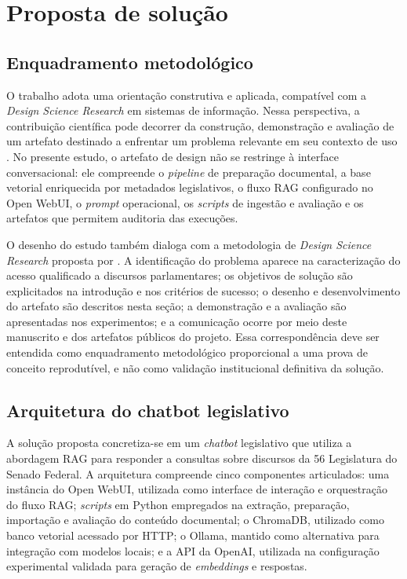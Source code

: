 \section{Proposta de solução}

\subsection{Enquadramento metodológico}

O trabalho adota uma orientação construtiva e aplicada, compatível com a \textit{Design Science Research} em sistemas de informação. Nessa perspectiva, a contribuição científica pode decorrer da construção, demonstração e avaliação de um artefato destinado a enfrentar um problema relevante em seu contexto de uso \parencite{hevnerEtAl2004designScience}. No presente estudo, o artefato de design não se restringe à interface conversacional: ele compreende o \textit{pipeline} de preparação documental, a base vetorial enriquecida por metadados legislativos, o fluxo RAG configurado no Open WebUI, o \textit{prompt} operacional, os \textit{scripts} de ingestão e avaliação e os artefatos que permitem auditoria das execuções.

O desenho do estudo também dialoga com a metodologia de \textit{Design Science Research} proposta por \textcite{peffersEtAl2007dsrm}. A identificação do problema aparece na caracterização do acesso qualificado a discursos parlamentares; os objetivos de solução são explicitados na introdução e nos critérios de sucesso; o desenho e desenvolvimento do artefato são descritos nesta seção; a demonstração e a avaliação são apresentadas nos experimentos; e a comunicação ocorre por meio deste manuscrito e dos artefatos públicos do projeto. Essa correspondência deve ser entendida como enquadramento metodológico proporcional a uma prova de conceito reprodutível, e não como validação institucional definitiva da solução.

\subsection{Arquitetura do chatbot legislativo}

A solução proposta concretiza-se em um \textit{chatbot} legislativo que utiliza a abordagem RAG para responder a consultas sobre discursos da 56\textordfeminine{} Legislatura do Senado Federal. A arquitetura compreende cinco componentes articulados: uma instância do Open WebUI, utilizada como interface de interação e orquestração do fluxo RAG; \textit{scripts} em Python empregados na extração, preparação, importação e avaliação do conteúdo documental; o ChromaDB, utilizado como banco vetorial acessado por HTTP; o Ollama, mantido como alternativa para integração com modelos locais; e a API da OpenAI, utilizada na configuração experimental validada para geração de \textit{embeddings} e respostas.

